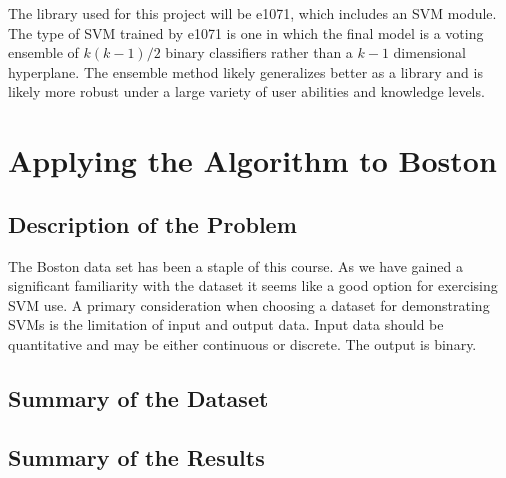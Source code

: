 \documentclass[a4paper,man,natbib]{apa6}
\begin{document}
The library used for this project will be e1071, which includes an SVM module. The type of SVM trained by e1071 is one in which the final model is a voting ensemble of $k(k-1)/2$ binary classifiers rather than a $k-1$ dimensional hyperplane. The ensemble method likely generalizes better as a library and is likely more robust under a large variety of user abilities and knowledge levels.

\clearpage

\section{Applying the Algorithm to Boston}
\subsection{Description of the Problem}

The Boston data set has been a staple of this course. As we have gained a significant familiarity with the dataset it seems like a good option for exercising SVM use. A primary consideration when choosing a dataset for demonstrating SVMs is the limitation of input and output data. Input data should be quantitative and may be either continuous or discrete. The output is binary. 

\subsection{Summary of the Dataset}
\subsection{Summary of the Results}
\end{document}
